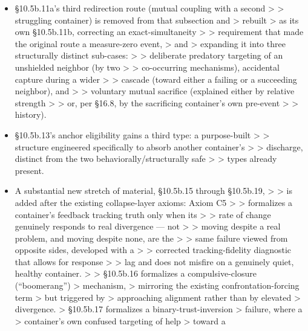 \documentclass[
]{article}
\begin{document}
\begin{itemize}
\item
  §10.5b.11a's third redirection route (mutual coupling with a second
  \textgreater{} \textgreater{} struggling container) is removed from
  that subsection and \textgreater{} rebuilt \textgreater{} as its own
  §10.5b.11b, correcting an exact-simultaneity \textgreater{}
  \textgreater{} requirement that made the original route a measure-zero
  event, \textgreater{} and \textgreater{} expanding it into three
  structurally distinct sub-cases: \textgreater{} \textgreater{}
  deliberate predatory targeting of an unshielded neighbor (by two
  \textgreater{} \textgreater{} co-occurring mechanisms), accidental
  capture during a wider \textgreater{} \textgreater{} cascade (toward
  either a failing or a succeeding neighbor), and \textgreater{}
  \textgreater{} voluntary mutual sacrifice (explained either by
  relative strength \textgreater{} \textgreater{} or, per §16.8, by the
  sacrificing container's own pre-event \textgreater{} \textgreater{}
  history).
\item
  §10.5b.13's anchor eligibility gains a third type: a purpose-built
  \textgreater{} \textgreater{} structure engineered specifically to
  absorb another container's \textgreater{} \textgreater{} discharge,
  distinct from the two behaviorally/structurally safe \textgreater{}
  \textgreater{} types already present.
\item
  A substantial new stretch of material, §10.5b.15 through §10.5b.19,
  \textgreater{} \textgreater{} is added after the existing
  collapse-layer axioms: Axiom C5 \textgreater{} \textgreater{}
  formalizes a container's feedback tracking truth only when its
  \textgreater{} \textgreater{} rate of change genuinely responds to
  real divergence --- not \textgreater{} \textgreater{} moving despite a
  real problem, and moving despite none, are the \textgreater{}
  \textgreater{} same failure viewed from opposite sides, developed with
  a \textgreater{} \textgreater{} corrected tracking-fidelity diagnostic
  that allows for response \textgreater{} \textgreater{} lag and does
  not misfire on a genuinely quiet, healthy container. \textgreater{}
  \textgreater{} §10.5b.16 formalizes a compulsive-closure
  (``boomerang'') \textgreater{} mechanism, \textgreater{} mirroring the
  existing confrontation-forcing term \textgreater{} but triggered by
  \textgreater{} approaching alignment rather than by elevated
  \textgreater{} divergence. \textgreater{} §10.5b.17 formalizes a
  binary-trust-inversion \textgreater{} failure, where a \textgreater{}
  container's own confused targeting of help \textgreater{} toward a

\end{itemize}
\end{document}
